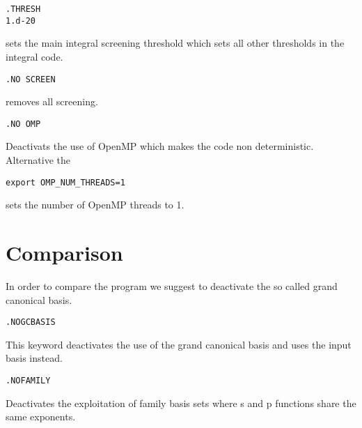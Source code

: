 \begin{verbatim}
.THRESH
1.d-20
\end{verbatim}
sets the main integral screening threshold which sets all other thresholds in the integral code. 
\begin{verbatim}
.NO SCREEN
\end{verbatim}
removes all screening. 
\begin{verbatim}
.NO OMP 
\end{verbatim}
Deactivats the use of OpenMP which makes the code non deterministic. Alternative the 
\begin{verbatim}
export OMP_NUM_THREADS=1
\end{verbatim}
sets the number of OpenMP threads to 1.

\section{Comparison}

In order to compare the {\lsdalton} program
we suggest to deactivate the so called grand canonical basis. 
\begin{verbatim}
.NOGCBASIS
\end{verbatim}
This keyword deactivates the use of the grand canonical basis and uses the input basis instead. 
\begin{verbatim}
.NOFAMILY
\end{verbatim}
Deactivates the exploitation of family basis sets where s and p functions share the same exponents. 






